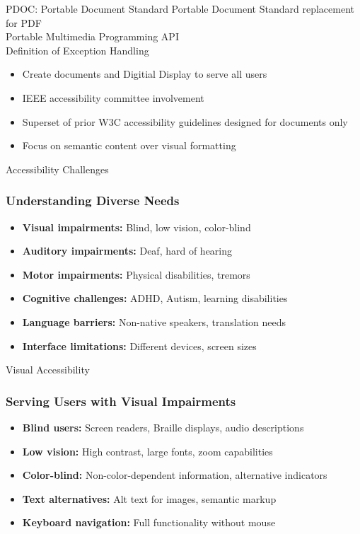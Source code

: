 \documentclass[aspectratio=169]{beamer}
\begin{document}
\begin{frame}[fragile]{PDOC: Portable Document Standard}
Portable Document Standard replacement for PDF \\
Portable Multimedia Programming API \\ 
Definition of Exception Handling
\begin{itemize}
\item Create documents and Digitial Display to serve all users
\item IEEE accessibility committee involvement
\item Superset of prior W3C accessibility guidelines designed for documents only
\item Focus on semantic content over visual formatting
\end{itemize}
\end{frame}

\begin{frame}[fragile]{Accessibility Challenges}
\frametitle{Understanding Diverse Needs}
\begin{itemize}
\item \textbf{Visual impairments:} Blind, low vision, color-blind
\item \textbf{Auditory impairments:} Deaf, hard of hearing
\item \textbf{Motor impairments:} Physical disabilities, tremors
\item \textbf{Cognitive challenges:} ADHD, Autism, learning disabilities
\item \textbf{Language barriers:} Non-native speakers, translation needs
\item \textbf{Interface limitations:} Different devices, screen sizes
\end{itemize}
\end{frame}

\begin{frame}[fragile]{Visual Accessibility}
\frametitle{Serving Users with Visual Impairments}
\begin{itemize}
\item \textbf{Blind users:} Screen readers, Braille displays, audio descriptions
\item \textbf{Low vision:} High contrast, large fonts, zoom capabilities
\item \textbf{Color-blind:} Non-color-dependent information, alternative indicators
\item \textbf{Text alternatives:} Alt text for images, semantic markup
\item \textbf{Keyboard navigation:} Full functionality without mouse
\end{itemize}
\end{frame}
\end{document}
